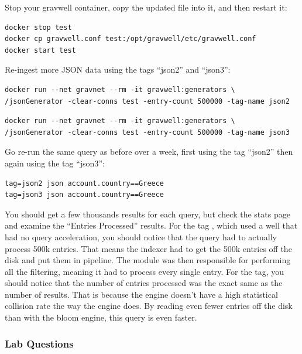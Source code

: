 {Stop your gravwell container, copy the updated  file
into it, and then restart it:

\begin{Verbatim}[breaklines=true]
docker stop test
docker cp gravwell.conf test:/opt/gravwell/etc/gravwell.conf
docker start test
\end{Verbatim}

Re-ingest more JSON data using the tags ``json2'' and
``json3'':}

\begin{Verbatim}[breaklines=true]
docker run --net gravnet --rm -it gravwell:generators \
/jsonGenerator -clear-conns test -entry-count 500000 -tag-name json2
\end{Verbatim}

\begin{Verbatim}[breaklines=true]
docker run --net gravnet --rm -it gravwell:generators \
/jsonGenerator -clear-conns test -entry-count 500000 -tag-name json3
\end{Verbatim}

Go re-run the same query as before over a week, first using the tag
``json2'' then again using the tag ``json3'':

\begin{Verbatim}[breaklines=true]
tag=json2 json account.country==Greece
tag=json3 json account.country==Greece
\end{Verbatim}

You should get a few thousands results for each query,  but check the stats page and examine the
``Entries Processed'' results. For the tag , which used a well
that had no query acceleration, you should notice that the query had to
actually process 500k entries. That means the indexer had to get the
500k entries off the disk and put them in pipeline. The \code{json} module
was then responsible for performing all the filtering, meaning it had to
process every single entry. For the \code{json2} tag, you should notice
that the number of entries processed was the exact same as the number of
results. That is because the \code{index} engine doesn't have a high
statistical collision rate the way the \code{bloom} engine does. By reading
even fewer entries off the disk than with the bloom engine, this query is even faster.

\subsubsection{Lab Questions}

